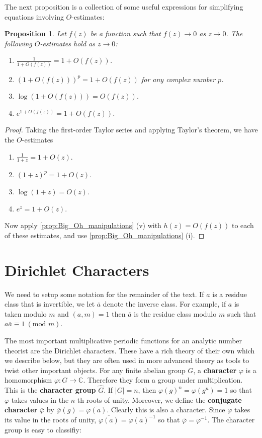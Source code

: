 \documentclass[12pt]{book}
\newtheorem{proposition}{Proposition}[section]
\theoremstyle{definition}\newframedtheorem{method}{Method}
\newcommand{\tmod}[1]{\ \left(\text{mod }#1\right)}
\newcommand{\C}{\mathbb{C}}
\newcommand{\vphi}{\varphi}
\newcommand{\<}{\langle}
\renewcommand{\>}{\rangle}
\newcommand{\what}{\widehat}
\newcommand{\conj}{\overline}
\begin{document}
      The next proposition is a collection of some useful expressions for simplifying equations involving $O$-estimates:

      \begin{proposition}
        Let $f(z)$ be a function such that $f(z) \to 0$ as $z \to 0$. The following $O$-estimates hold as $z \to 0$:
        \begin{enumerate}[label=(\roman*)]
          \item $\frac{1}{1+O(f(z))} = 1+O(f(z))$.
          \item $(1+O(f(z)))^{p} = 1+O(f(z))$ for any complex number $p$.
          \item $\log(1+O(f(z))) = O(f(z))$.
          \item $e^{1+O(f(z))} = 1+O(f(z))$.
        \end{enumerate}
      \end{proposition}
      \begin{proof}
        Taking the first-order Taylor series and applying Taylor's theorem, we have the $O$-estimates
        \begin{enumerate}[label=(\roman*)]
          \item $\frac{1}{1+z} = 1+O(z)$.
          \item $(1+z)^{p} = 1+O(z)$.
          \item $\log(1+z) = O(z)$.
          \item $e^{z} = 1+O(z)$.
        \end{enumerate}
        Now apply \cref{prop:Big_Oh_manipulations} (v) with $h(z) = O(f(z))$ to each of these estimates, and use \cref{prop:Big_Oh_manipulations} (i).
      \end{proof}
  \section{Dirichlet Characters}
    We need to setup some notation for the remainder of the text. If $a$ is a residue class that is invertible, we let $\conj{a}$ denote the inverse class. For example, if $a$ is taken modulo $m$ and $(a,m) = 1$ then $\conj{a}$ is the residue class modulo $m$ such that $a\conj{a} \equiv 1 \tmod{m}$.

    The most important multiplicative periodic functions for an analytic number theorist are the Dirichlet characters. These have a rich theory of their own which we describe below, but they are often used in more advanced theory as tools to twist other important objects. For any finite abelian group $G$, a \textbf{character} $\vphi$ is a homomorphism $\vphi:G \to \C$. Therefore they form a group under multiplication. This is the \textbf{character group} $\what{G}$. If $|G| = n$, then $\vphi(g)^{n} = \vphi(g^{n}) = 1$ so that $\vphi$ takes values in the $n$-th roots of unity. Moreover, we define the \textbf{conjugate character} $\conj{\vphi}$ by $\conj{\vphi}(g) = \conj{\vphi(a)}$. Clearly this is also a character. Since $\vphi$ takes its value in the roots of unity, $\conj{\vphi(a)} = \vphi(a)^{-1}$ so that $\conj{\vphi} = \vphi^{-1}$. The character group is easy to classifiy:
\end{document}
